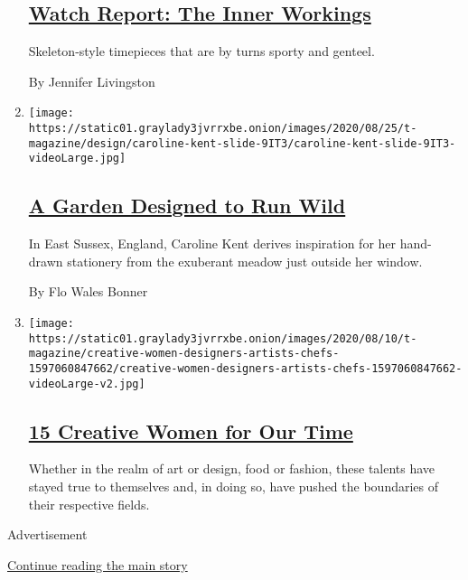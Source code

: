 \begin{enumerate}
  \hypertarget{watch-report-the-inner-workings}{%
  \subsection{\texorpdfstring{\href{/2020/08/27/t-magazine/skeleton-watches.html}{Watch
  Report: The Inner
  Workings}}{Watch Report: The Inner Workings}}\label{watch-report-the-inner-workings}}

  Skeleton-style timepieces that are by turns sporty and genteel.

  By Jennifer Livingston
\item
  \texttt{[image: https://static01.graylady3jvrrxbe.onion/images/2020/08/25/t-magazine/design/caroline-kent-slide-9IT3/caroline-kent-slide-9IT3-videoLarge.jpg]}

  \hypertarget{a-garden-designed-to-run-wild}{%
  \subsection{\texorpdfstring{\href{/2020/08/26/t-magazine/garden-flowers-art-stationery.html}{A
  Garden Designed to Run
  Wild}}{A Garden Designed to Run Wild}}\label{a-garden-designed-to-run-wild}}

  In East Sussex, England, Caroline Kent derives inspiration for her
  hand-drawn stationery from the exuberant meadow just outside her
  window.

  By Flo Wales Bonner
\item
  \texttt{[image: https://static01.graylady3jvrrxbe.onion/images/2020/08/10/t-magazine/creative-women-designers-artists-chefs-1597060847662/creative-women-designers-artists-chefs-1597060847662-videoLarge-v2.jpg]}

  \hypertarget{15-creative-women-for-our-time}{%
  \subsection{\texorpdfstring{\href{/interactive/2020/08/10/t-magazine/creative-women-designers-artists-chefs.html}{15
  Creative Women for Our
  Time}}{15 Creative Women for Our Time}}\label{15-creative-women-for-our-time}}

  Whether in the realm of art or design, food or fashion, these talents
  have stayed true to themselves and, in doing so, have pushed the
  boundaries of their respective fields.
\end{enumerate}

Advertisement

\protect\hyperlink{after-mid1}{Continue reading the main story}

